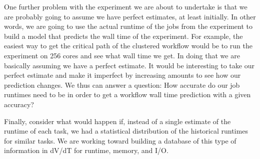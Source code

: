 One further problem with the experiment we are about to undertake is that we are probably going to assume we have perfect estimates, at least initially. In other words, we are going to use the actual runtime of the jobs from the experiment to build a model that predicts the wall time of the experiment. For example, the easiest way to get the critical path of the clustered workflow would be to run the experiment on 256 cores and see what wall time we get. In doing that we are basically assuming we have a perfect estimate. It would be interesting to take our perfect estimate and make it imperfect by increasing amounts to see how our prediction changes. We thus can answer a question: How accurate do our job runtimes need to be in order to get a workflow wall time prediction with a given accuracy?

Finally, consider what would happen if, instead of a single estimate of the runtime of each task, we had a statistical distribution of the historical runtimes for similar tasks. We are working toward building a database of this type of information in dV/dT for runtime, memory, and I/O.

